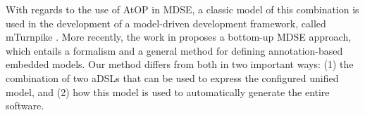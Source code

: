 With regards to the use of AtOP in MDSE, a classic model of this combination is used in the development of a model-driven development framework, called mTurnpike \cite{wada_modeling_2005}. 
%
More recently, the work in \cite{balz_embedding_2012} proposes a bottom-up MDSE approach, which entails a formalism and a general method for defining annotation-based embedded models. 
%
Our method differs from both \cite{wada_modeling_2005,balz_embedding_2012} in two important ways: 
(1) the combination of two aDSLs that can be used to express the configured unified model, and (2) how this model is used to automatically generate the entire software. 